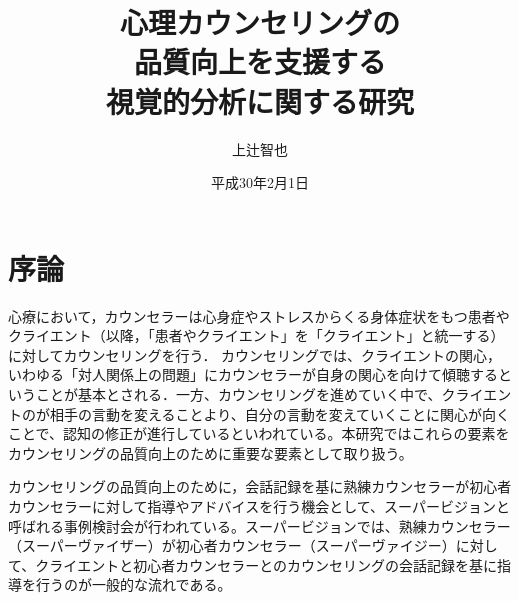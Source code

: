 \documentclass[shuuron]{kuee}
\title{心理カウンセリングの\\品質向上を支援する\\視覚的分析に関する研究}
\author{上辻智也}
\date{平成30年2月1日}
\begin{document}
\maketitle
\tableofcontents


\chapter{序論}



心療において，カウンセラーは心身症やストレスからくる身体症状をもつ患者やクライエント（以降，「患者やクライエント」を「クライエント」と統一する）に対してカウンセリングを行う．%
カウンセリングでは、クライエントの関心，いわゆる「対人関係上の問題」にカウンセラーが自身の関心を向けて傾聴するということが基本とされる\cite{zokad}．一方、カウンセリングを進めていく中で、クライエントのが相手の言動を変えることより、自分の言動を変えていくことに関心が向くことで、認知の修正が進行しているといわれている\cite{Darshana}。本研究ではこれらの要素をカウンセリングの品質向上のために重要な要素として取り扱う。







カウンセリングの品質向上のために，会話記録を基に熟練カウンセラーが初心者カウンセラーに対して指導やアドバイスを行う機会として、スーパービジョンと呼ばれる事例検討会が行われている。スーパービジョンでは、熟練カウンセラー（スーパーヴァイザー）が初心者カウンセラー（スーパーヴァイジー）に対して、クライエントと初心者カウンセラーとのカウンセリングの会話記録を基に指導を行うのが一般的な流れである。%
\end{document}
